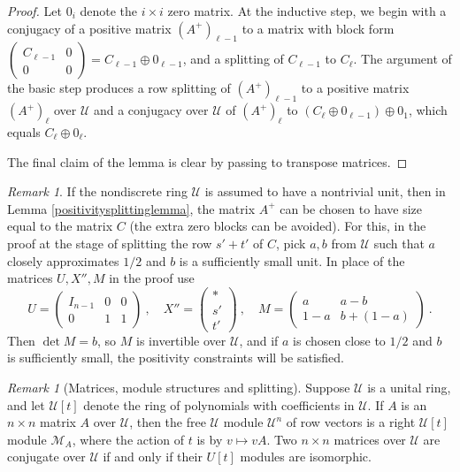 \documentclass{amsart}
\theoremstyle{definition}
\theoremstyle{remark}
\newtheorem{remark}[theorem]{Remark}
\numberwithin{equation}{section}
\begin{document}
{{\begin{proof}
Let $0_i$ denote the  $i\times i$ zero matrix. 
At the inductive step,
 we begin with a conjugacy of a positive matrix $(A^+)_{\ell -1}$ to a matrix 
with block form 
$
\left(\begin{smallmatrix} C_{\ell -1} & 0 \\ 0& 0 
\end{smallmatrix}\right) 
=C_{\ell -1}\oplus 0_{\ell -1}$, and a splitting of $C_{\ell -1}$ to $C_{\ell}$. 
The argument of the basic step produces a 
row splitting    of $(A^+)_{\ell -1}$
to a positive matrix $(A^+)_{\ell} $ over $\mathcal U$ 
and a conjugacy  over $\mathcal U$ of 
$(A^+)_{\ell} $ 
to $(C_{\ell}\oplus 0_{\ell -1})\oplus 0_1$, which equals 
$C_{\ell}\oplus 0_{\ell}$. 

The final claim of the lemma is clear by passing to transpose matrices. 
\end{proof}

\begin{remark} \label{ifunit} 
If the nondiscrete ring $\mathcal U$ is assumed to have a nontrivial 
unit, then in Lemma 
\ref{positivitysplittinglemma}, the matrix $A^+$ can be chosen to have 
size equal to the matrix $C$ (the extra zero blocks can be avoided). 
For this, in the proof at the stage of splitting the row 
$s'+t'$ of $C$, pick $a,b$ from $\mathcal U$ such that 
$a$ closely approximates $1/2$ and $b$ is a sufficiently small unit. 
In place of the matrices $U,X'',M$ in the proof use 
\[
U = \begin{pmatrix} I_{n-1} & 0&0\\ 0&  1 & 1 
\end{pmatrix} \ , \quad 
X''= 
\begin{pmatrix}
* \\ 
s' \\ 
t' 
\end{pmatrix} \ , \quad 
M= \begin{pmatrix}
             a &a-b\\
           1-a  &b+(1-a)
   \end{pmatrix}\  . 
\] 
Then $\det M =b$, so $M$ is invertible over $\mathcal U$,  
and if $a$ is chosen close to $1/2$ and $b$ is sufficiently small, 
the positivity constraints will be satisfied.  
\end{remark} 

\begin{remark}[Matrices, module structures and splitting]
Suppose $\mathcal U$ is a  unital ring, and 
let $\mathcal U[t]$ denote the ring of polynomials with coefficients in 
$\mathcal U$. 
If $A$ is an  $n\times n$ matrix $A$ over $\mathcal U$, 
then the free $\mathcal U$ module $\mathcal U^n$ of row vectors 
is a right $\mathcal U[t]$ module $\mathcal M_A$, where the action 
of $t$ is by $v\mapsto vA$. 
Two $n\times n$ matrices over $\mathcal U$ 
are conjugate 
over $\mathcal U$ if and only if their $U[t]$ modules are
isomorphic. 


\end{remark}}}
\end{document}
